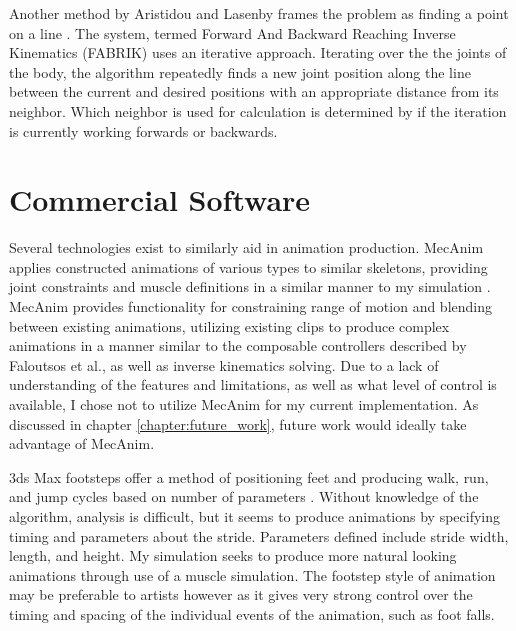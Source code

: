 Another method by Aristidou and Lasenby frames the problem as finding a point on a line \cite{fabrik}.  The system, termed Forward And Backward Reaching Inverse Kinematics (FABRIK) uses an iterative approach.  Iterating over the the joints of the body, the algorithm repeatedly finds a new joint position along the line between the current and desired positions with an appropriate distance from its neighbor.  Which neighbor is used for calculation is determined by if the iteration is currently working forwards or backwards.

\section{Commercial Software}
\label{section:commercial_bg}
Several technologies exist to similarly aid in animation production. \unity{} MecAnim applies constructed animations of various types to similar skeletons, providing joint constraints and muscle definitions in a similar manner to my simulation \cite{unity_mecanim}.  MecAnim provides functionality for constraining range of motion and blending between existing animations, utilizing existing clips to produce complex animations in a manner similar to the composable controllers described by Faloutsos et al., as well as inverse kinematics solving.  Due to a lack of understanding of the features and limitations, as well as what level of control is available, I chose not to utilize MecAnim for my current implementation.  As discussed in chapter \ref{chapter:future_work}, future work would ideally take advantage of MecAnim.

3ds Max footsteps offer a method of positioning feet and producing walk, run, and jump cycles based on  number of parameters \cite{3dsmax}.  Without knowledge of the algorithm, analysis is difficult, but it seems to produce animations by specifying timing and parameters about the stride.  Parameters defined include stride width, length, and height.  My simulation seeks to produce more natural looking animations through use of a muscle simulation.  The footstep style of animation may be preferable to artists however as it gives very strong control over the timing and spacing of the individual events of the animation, such as foot falls.

